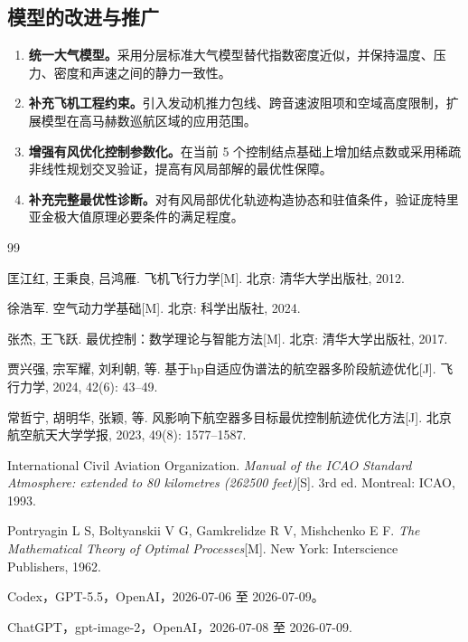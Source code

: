 \documentclass[withoutpreface,bwprint]{cumcmthesis}
\begin{document}
\subsection{模型的改进与推广}

\begin{enumerate}[left=0pt]
\item \textbf{统一大气模型。}采用分层标准大气模型替代指数密度近似，并保持温度、压力、密度和声速之间的静力一致性。
\item \textbf{补充飞机工程约束。}引入发动机推力包线、跨音速波阻项和空域高度限制，扩展模型在高马赫数巡航区域的应用范围。
\item \textbf{增强有风优化控制参数化。}在当前 5 个控制结点基础上增加结点数或采用稀疏非线性规划交叉验证，提高有风局部解的最优性保障。
\item \textbf{补充完整最优性诊断。}对有风局部优化轨迹构造协态和驻值条件，验证庞特里亚金极大值原理必要条件的满足程度。
\end{enumerate}


\newpage
\begin{thebibliography}{99}


 匡江红, 王秉良, 吕鸿雁. 飞机飞行力学[M]. 北京: 清华大学出版社, 2012.

 徐浩军. 空气动力学基础[M]. 北京: 科学出版社, 2024.

 张杰, 王飞跃. 最优控制：数学理论与智能方法[M]. 北京: 清华大学出版社, 2017.

 贾兴强, 宗军耀, 刘利朝, 等. 基于hp自适应伪谱法的航空器多阶段航迹优化[J]. 飞行力学, 2024, 42(6): 43--49.

 常哲宁, 胡明华, 张颖, 等. 风影响下航空器多目标最优控制航迹优化方法[J]. 北京航空航天大学学报, 2023, 49(8): 1577--1587.

 International Civil Aviation Organization. \emph{Manual of the ICAO Standard Atmosphere: extended to 80 kilometres (262500 feet)}[S]. 3rd ed. Montreal: ICAO, 1993.

 Pontryagin L S, Boltyanskii V G, Gamkrelidze R V, Mishchenko E F. \emph{The Mathematical Theory of Optimal Processes}[M]. New York: Interscience Publishers, 1962.

 Codex，GPT-5.5，OpenAI，2026-07-06 至 2026-07-09。

 ChatGPT，gpt-image-2，OpenAI，2026-07-08 至 2026-07-09.

\end{thebibliography}
\end{document}
